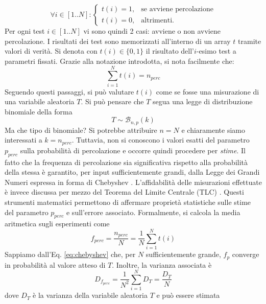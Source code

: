 \begin{equation}
    \forall i \in [1..N] : 
    \begin{cases}
        t(i) = 1 ,& \text{se avviene percolazione} \\
        t(i) = 0 ,& \text{altrimenti}.
    \end{cases}
\end{equation}
Per ogni test $i \in [1..N]$ vi sono quindi 2 casi: avviene o non avviene percolazione.
I risultati dei test sono memorizzati all'interno di un array $t$ tramite valori di verità. 
Si denota con $t(i) \in \{0,1\}$ il risultato dell'$i$-esimo test a parametri fissati.
Grazie alla notazione introdotta, si nota facilmente che:
\begin{equation}
    \sum_{i=1}^{N} t(i) = n_{perc}
\end{equation}
Seguendo questi passaggi, si può valutare $t(i)$ come se fosse una misurazione di una 
variabile aleatoria $T$.
Si può pensare che $T$ segua una legge di distribuzione binomiale della forma
\begin{equation*}
    T \sim \mathcal{B}_{n,p}(k)
\end{equation*} 
Ma che tipo di binomiale? Si potrebbe attribuire $n=N$ e chiaramente siamo interessati a $k=n_{perc}$.
Tuttavia, non si conoscono i valori esatti del parametro $p_{perc}$ sulla probabilità di percolazione e 
occorre quindi procedere per \textit{stime}.
Il fatto che la frequenza di percolazione sia significativa rispetto alla probabilità 
della stessa è garantito, per input sufficientemente grandi, dalla Legge dei Grandi Numeri
espressa in forma di Chebyshev \cite{lgn-chebyshev}.
L'affidabilità delle misurazioni effettuate è invece discussa per mezzo del 
Teorema del Limite Centrale (TLC) \cite{tlc}.
Questi strumenti matematici permettono di affermare proprietà statistiche sulle 
stime del parametro $p_{perc}$ e sull'errore associato. Formalmente, si calcola 
la media aritmetica sugli esperimenti come 
\begin{equation}
    f_{perc} = \frac{n_{perc}}{N} = \frac{1}{N} \sum_{i=1}^{N} t(i)
\end{equation}
Sappiamo dall'Eq. \ref{eq:chebyshev} che, per $N$ sufficientemente grande, $f_p$ converge 
in probabilità al valore atteso di $T$. Inoltre, la varianza associata è
\begin{equation}
    D_{f_{perc}} = \frac{1}{N^2} \sum_{i=1}^{N} {D}_T = \frac{{D}_T}{N}
    \label{eq:d_f_perc}
\end{equation}
dove $D_T$ è la varianza della variabile aleatoria $T$ e può essere stimata 
